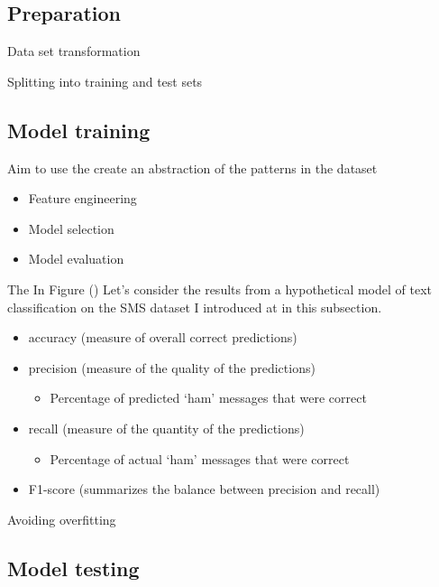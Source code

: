 \documentclass[
]{article}
\providecommand{\tightlist}{%
  \setlength{\itemsep}{0pt}\setlength{\parskip}{0pt}}
\begin{document}
\hypertarget{preparation-1}{%
\subsection{Preparation}\label{preparation-1}}

Data set transformation

Splitting into training and test sets

\hypertarget{model-training}{%
\subsection{Model training}\label{model-training}}

Aim to use the create an abstraction of the patterns in the dataset

\begin{itemize}
\item
  Feature engineering
\item
  Model selection
\item
  Model evaluation
\end{itemize}

The In Figure () Let's consider the results from a hypothetical model of text classification on the SMS dataset I introduced at in this subsection.

\begin{itemize}
\tightlist
\item
  accuracy (measure of overall correct predictions)
\item
  precision (measure of the quality of the predictions)

  \begin{itemize}
  \tightlist
  \item
    Percentage of predicted `ham' messages that were correct
  \end{itemize}
\item
  recall (measure of the quantity of the predictions)

  \begin{itemize}
  \tightlist
  \item
    Percentage of actual `ham' messages that were correct
  \end{itemize}
\item
  F1-score (summarizes the balance between precision and recall)
\end{itemize}

Avoiding overfitting

\hypertarget{model-testing}{%
\subsection{Model testing}\label{model-testing}}
\end{document}
